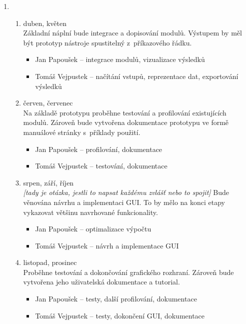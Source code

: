 \documentclass[a4paper]{article}
\begin{document}
\begin{enumerate}

\item\begin{enumerate}
	\item duben, květen\\
		Základní náplní bude integrace a dopisování modulů. Výstupem by měl být prototyp nástroje spustitelný z~příkazového řádku.
        \begin{itemize}
            \item   Jan Papoušek -- integrace modulů, vizualizace výsledků
            \item   Tomáš Vejpustek -- načítání vstupů, reprezentace dat, exportování výsledků
        \end{itemize}
	\item červen, červenec\\
		Na základě prototypu proběhne testování a profilování existujících modulů.
		Zároveň bude vytvořena dokumentace prototypu ve formě manuálové stránky s~příklady použití.
        \begin{itemize}
            \item   Jan Papoušek -- profilování, dokumentace
            \item   Tomáš Vejpustek -- testování, dokumentace
        \end{itemize}
	\item srpen, září, říjen\\ \emph{[tady je otázka, jestli to napsat každému zvlášť nebo to spojit]}
		Bude věnována návrhu a implementaci GUI. To by mělo na konci etapy vykazovat většinu navrhované funkcionality.
        \begin{itemize}
            \item   Jan Papoušek -- optimalizace výpočtu
            \item   Tomáš Vejpustek -- návrh a implementace GUI
        \end{itemize}
	\item listopad, prosinec\\
		Proběhne testování a dokončování grafického rozhraní. Zároveň bude vytvořena jeho uživatelská dokumentace a tutorial.
        \begin{itemize}
            \item   Jan Papoušek -- testy, další profilování, dokumentace
            \item   Tomáš Vejpustek -- testy, dokončení GUI, dokumentace
        \end{itemize}
	\end{enumerate}
\end{enumerate}



\end{document}
